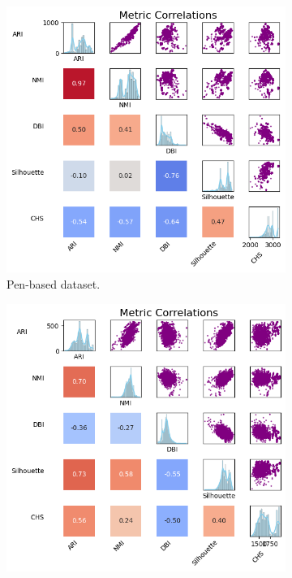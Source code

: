 \begin{figure}[H]
	\centering
	\begin{subfigure}{0.32\textwidth}
		\centering
		\includegraphics[width=\linewidth]{figures/FuzzyCMeans/penBased_metrics_correlations_matrix.png}
		\caption{Pen-based dataset.}
	\end{subfigure}
	\begin{subfigure}{0.32\textwidth}
		\centering
		\includegraphics[width=\linewidth]{figures/FuzzyCMeans/mushroom_metrics_correlations_matrix.png}

\end{subfigure}
\end{figure}
